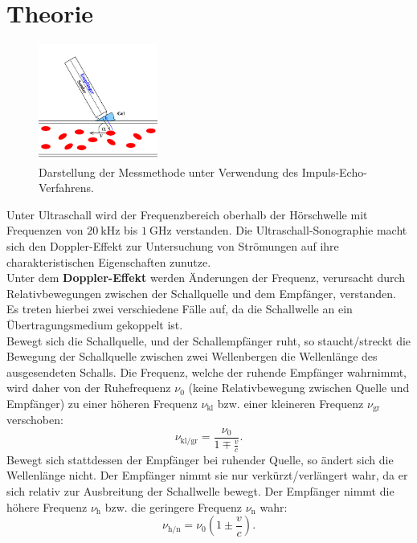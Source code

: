 \section{Theorie}
\label{sec:Theorie}
\begin{figure}
  \centering
  \includegraphics[width=0.35\textwidth]{Bilder/sonographie.png}
  \caption{Darstellung der Messmethode unter Verwendung des Impuls-Echo-Verfahrens. \cite{Anleitung}}
  \label{fig:doppler}
\end{figure}
Unter Ultraschall wird der Frequenzbereich oberhalb der Hörschwelle mit Frequenzen von $\SI{20}{\kilo\Hz}$ bis $\SI{1}{\giga\Hz}$ verstanden.
Die Ultraschall-Sonographie macht sich den Doppler-Effekt zur Untersuchung von Strömungen auf ihre charakteristischen Eigenschaften zunutze.\\
Unter dem \textbf{Doppler-Effekt} werden Änderungen der Frequenz, verursacht durch Relativbewegungen zwischen der Schallquelle und dem Empfänger, verstanden.
Es treten hierbei zwei verschiedene Fälle auf, da die Schallwelle an ein Übertragungsmedium gekoppelt ist.\\
Bewegt sich die Schallquelle, und der Schallempfänger ruht, so staucht/streckt die Bewegung der Schallquelle zwischen zwei Wellenbergen die Wellenlänge des ausgesendeten Schalls.
Die Frequenz, welche der ruhende Empfänger wahrnimmt, wird daher von der Ruhefrequenz $\nu_0$ (keine Relativbewegung zwischen Quelle und Empfänger) zu einer höheren Frequenz $\nu_\mathrm{kl}$ bzw. einer kleineren Frequenz $\nu_\mathrm{gr}$ verschoben:
\begin{equation}
  \label{eqn:doppleruno}
  \nu_\mathrm{kl/gr}=\frac{\nu_0}{1\mp \frac{v}{c}}\text{.}
\end{equation}
Bewegt sich stattdessen der Empfänger bei ruhender Quelle, so ändert sich die Wellenlänge nicht. Der Empfänger nimmt sie nur verkürzt/verlängert wahr, da er sich relativ zur Ausbreitung der Schallwelle bewegt.
Der Empfänger nimmt die höhere Frequenz $\nu_\mathrm{h}$ bzw. die geringere Frequenz $\nu_\mathrm{n}$ wahr:
\begin{equation}
  \label{eqn:dopplerzwo}
  \nu_\mathrm{h/n}=\nu_0 \left(1\pm\frac{v}{c}\right)\text{.}
\end{equation}

